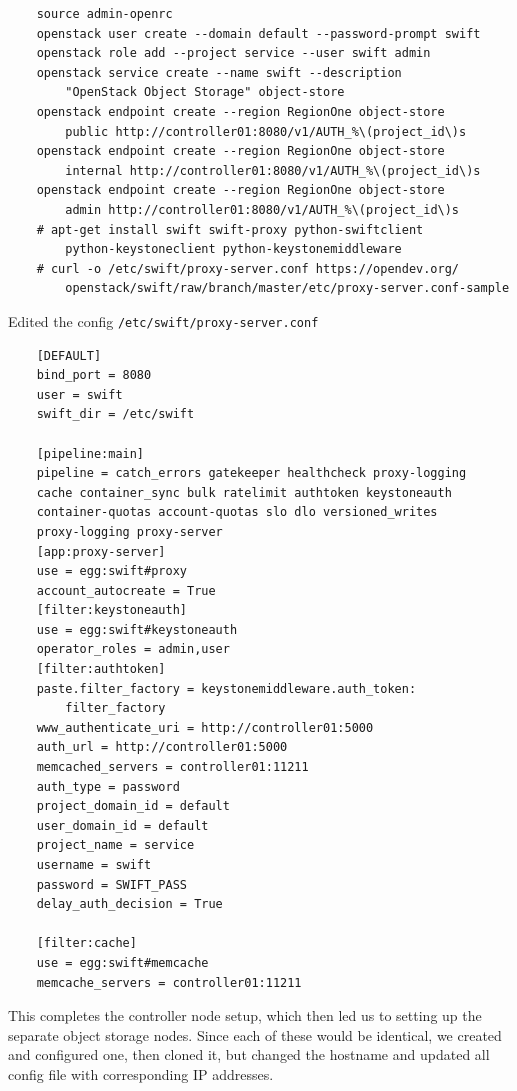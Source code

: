 \documentclass{article}
\begin{document}
\begin{verbatim}
    source admin-openrc
    openstack user create --domain default --password-prompt swift
    openstack role add --project service --user swift admin
    openstack service create --name swift --description 
        "OpenStack Object Storage" object-store
    openstack endpoint create --region RegionOne object-store 
        public http://controller01:8080/v1/AUTH_%\(project_id\)s
    openstack endpoint create --region RegionOne object-store 
        internal http://controller01:8080/v1/AUTH_%\(project_id\)s
    openstack endpoint create --region RegionOne object-store 
        admin http://controller01:8080/v1/AUTH_%\(project_id\)s
    # apt-get install swift swift-proxy python-swiftclient 
        python-keystoneclient python-keystonemiddleware
    # curl -o /etc/swift/proxy-server.conf https://opendev.org/
        openstack/swift/raw/branch/master/etc/proxy-server.conf-sample
\end{verbatim}

Edited the config \texttt{/etc/swift/proxy-server.conf}

\begin{verbatim}
    [DEFAULT]
    bind_port = 8080
    user = swift
    swift_dir = /etc/swift

    [pipeline:main]
    pipeline = catch_errors gatekeeper healthcheck proxy-logging
    cache container_sync bulk ratelimit authtoken keystoneauth
    container-quotas account-quotas slo dlo versioned_writes 
    proxy-logging proxy-server
    [app:proxy-server]
    use = egg:swift#proxy
    account_autocreate = True
    [filter:keystoneauth]
    use = egg:swift#keystoneauth
    operator_roles = admin,user
    [filter:authtoken]
    paste.filter_factory = keystonemiddleware.auth_token:
        filter_factory
    www_authenticate_uri = http://controller01:5000
    auth_url = http://controller01:5000
    memcached_servers = controller01:11211
    auth_type = password
    project_domain_id = default
    user_domain_id = default
    project_name = service
    username = swift
    password = SWIFT_PASS
    delay_auth_decision = True

    [filter:cache]
    use = egg:swift#memcache
    memcache_servers = controller01:11211
\end{verbatim}

This completes the controller node setup, which then led us to setting up the separate object storage nodes. Since each of these would be identical, we created and configured one, then cloned it, but changed the hostname and updated all config file with corresponding IP addresses.
\end{document}
